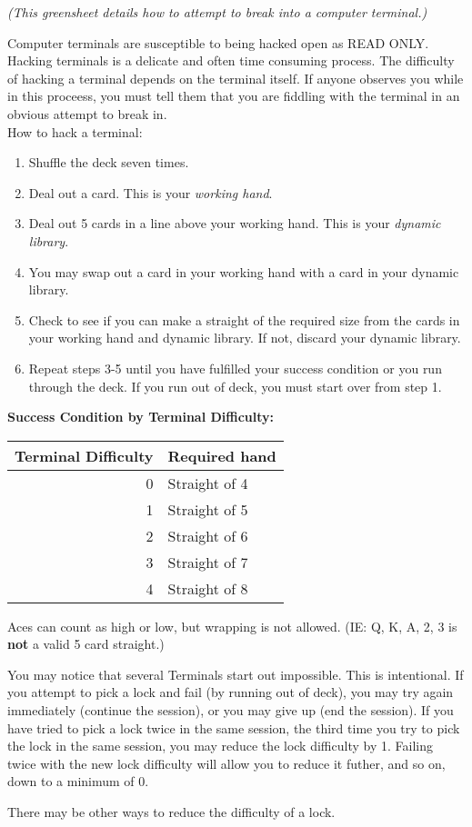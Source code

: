 \documentclass[green]{guildcamp4}
\begin{document}
\name{\gHacking{}}

\emph{(This greensheet details how to attempt to break into a computer terminal.)}

Computer terminals are susceptible to being hacked open as READ ONLY. Hacking terminals is a delicate and often time consuming process. The difficulty of hacking a terminal depends on the terminal itself. If anyone observes you while in this proceess, you must tell them that you are fiddling with the terminal in an obvious attempt to break in.\\

How to hack a terminal:
\begin{enumerate}
	\item Shuffle the deck seven times.
	\item Deal out a card. This is your {\em working hand}.
	\item Deal out 5 cards in a line above your working hand. This is your {\em dynamic library}.
	\item You may swap out a card in your working hand with a card in your dynamic library.
	\item Check to see if you can make a straight of the required size from the cards in your working hand and dynamic library. If not, discard your dynamic library.
	\item Repeat steps 3-5 until you have fulfilled your success condition or you run through the deck.  If you run out of deck, you must start over from step 1.
\end{enumerate}

{\bf Success Condition by Terminal Difficulty:}\\
\begin{tabular}{||r|l||}
	\hline\hline
	Terminal Difficulty	& Required hand\\
	\hline
	0	& Straight of 4\\
	1	& Straight of 5\\
	2	& Straight of 6\\
	3	& Straight of 7\\
	4	& Straight of 8\\
	\hline\hline 
\end{tabular}

\vspace{10 mm}

Aces can count as high or low, but wrapping is not allowed. (IE: Q, K, A, 2, 3 is {\bf not} a valid 5 card straight.)

You may notice that several Terminals start out impossible. This is intentional. If you attempt to pick a lock and fail (by running out of deck), you may try again immediately (continue the session), or you may give up (end the session). If you have tried to pick a lock twice in the same session, the third time you try to pick the lock in the same session, you may reduce the lock difficulty by 1. Failing twice with the new lock difficulty will allow you to reduce it futher, and so on, down to a minimum of 0.

There may be other ways to reduce the difficulty of a lock.
\end{document}
